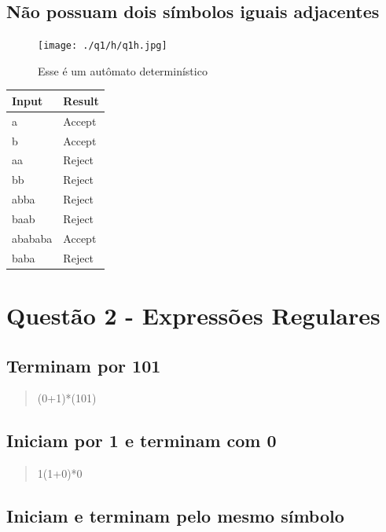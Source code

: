 \documentclass[11pt]{article}
\begin{document}
\subsection{Não possuam dois símbolos iguais adjacentes}
\label{sec:org840f8e5}
\begin{figure}[htbp]
\centering
\texttt{[image: ./q1/h/q1h.jpg]}
\caption{\label{fig:orgd0aff02}
Esse é um autômato determinístico}
\end{figure}

\begin{center}
\begin{tabular}{ll}
Input & Result\\
\hline
a & Accept\\
b & Accept\\
aa & Reject\\
bb & Reject\\
abba & Reject\\
baab & Reject\\
abababa & Accept\\
baba & Reject\\
\end{tabular}
\end{center}
\pagebreak

\section{Questão 2 - Expressões Regulares}
\label{sec:orgd4c0488}
\subsection{Terminam por 101}
\label{sec:orge644f56}

\begin{quote}
(0+1)*(101)
\end{quote}

\subsection{Iniciam por 1 e terminam com 0}
\label{sec:orgdc92331}

\begin{quote}
1(1+0)*0 
\end{quote}

\subsection{Iniciam e terminam pelo mesmo símbolo}
\label{sec:orgce49dc8}
\end{document}
